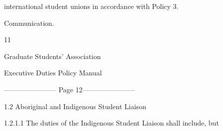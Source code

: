            international student unions in accordance with Policy 3.  

           Communication.   

  

  

  

  

  

  

  

  

  

  

  

  

  

  

  

  

  

  

  

  

  

  

  

  

  

  

  

  

  

  

  

  

  

  

  

  

  



                                                 11  

                                  

                                Graduate Students’ Association  

                                Executive Duties Policy Manual  

  


----------------------- Page 12-----------------------

                         1.2      Aboriginal and Indigenous Student Liaison   

  

1.2.1.1            The duties of the Indigenous Student Liaison shall include, but  

